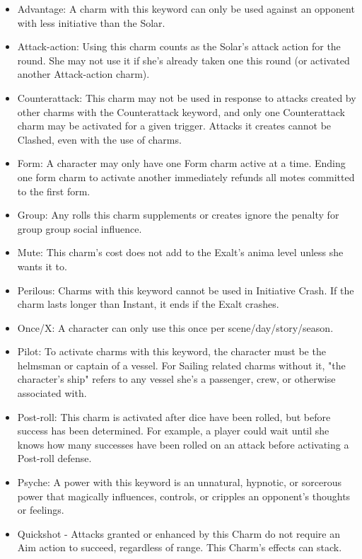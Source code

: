 \documentclass[oneside]{book}
\begin{document}
\begin{multicols}{2}
\begin{itemize}
  \item Advantage: A charm with this keyword can only be used against an opponent with less initiative than the Solar.
  \item Attack-action: Using this charm counts as the Solar's attack action for the round. She may not use it if she's already taken one this round (or activated another Attack-action charm).
  \item Counterattack: This charm may not be used in response to attacks created by other charms with the Counterattack keyword, and only one Counterattack charm may be activated for a given trigger. Attacks it creates cannot be Clashed, even with the use of charms.
  \item Form: A character may only have one Form charm active at a time. Ending one form charm to activate another immediately refunds all motes committed to the first form.
  \item Group: Any rolls this charm supplements or creates ignore the penalty for group group social influence.
  \item Mute: This charm's cost does not add to the Exalt's anima level unless she wants it to.
  \item Perilous: Charms with this keyword cannot be used in Initiative Crash. If the charm lasts longer than Instant, it ends if the Exalt crashes.
  \item Once/X: A character can only use this once per scene/day/story/season.
  \item Pilot: To activate charms with this keyword, the character must be the helmsman or captain of a vessel. For Sailing related charms without it, "the character's ship" refers to any vessel she's a passenger, crew, or otherwise associated with.
  \item Post-roll: This charm is activated after dice have been rolled, but before success has been determined. For example, a player could wait until she knows how many successes have been rolled on an attack before activating a Post-roll defense.
  \item Psyche: A power with this keyword is an unnatural, hypnotic, or sorcerous power that magically influences, controls, or cripples an opponent's thoughts or feelings.
  \item Quickshot - Attacks granted or enhanced by this Charm do not require an Aim action to succeed, regardless of range.
    This Charm's effects can stack.
\end{itemize}

\end{multicols}
\end{document}
